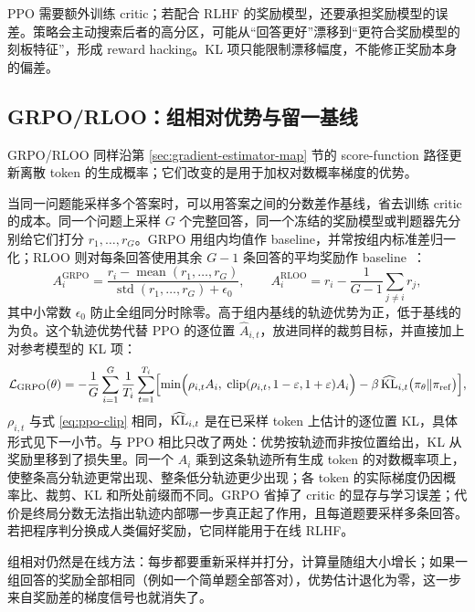 PPO 需要额外训练 critic；若配合 RLHF 的奖励模型，还要承担奖励模型的误差。策略会主动搜索后者的高分区，可能从“回答更好”漂移到“更符合奖励模型的刻板特征”，形成 reward hacking。KL 项只能限制漂移幅度，不能修正奖励本身的偏差。

\subsection{GRPO/RLOO：组相对优势与留一基线}

GRPO/RLOO 同样沿第 \ref{sec:gradient-estimator-map} 节的 score-function 路径更新离散 token 的生成概率；它们改变的是用于加权对数概率梯度的优势。

当同一问题能采样多个答案时，可以用答案之间的分数差作基线，省去训练 critic 的成本。同一个问题上采样 \(G\) 个完整回答，同一个冻结的奖励模型或判题器先分别给它们打分 \(r_1,\ldots,r_G\)。GRPO 用组内均值作 baseline，并常按组内标准差归一化；RLOO 则对每条回答使用其余 \(G-1\) 条回答的平均奖励作 baseline~\cite{shao2024grpo,ahmadian2024rloo}：
\begin{equation}
 A_i^{\mathrm{GRPO}}=\frac{r_i-\operatorname{mean}(r_1,\ldots,r_G)}{\operatorname{std}(r_1,\ldots,r_G)+\epsilon_0},\qquad
 A_i^{\mathrm{RLOO}}=r_i-\frac{1}{G-1}\sum_{j\neq i}r_j,
 \label{eq:grpo-advantage}
\end{equation}
其中小常数 \(\epsilon_0\) 防止全组同分时除零。高于组内基线的轨迹优势为正，低于基线的为负。这个轨迹优势代替 PPO 的逐位置 \(\widehat A_{i,t}\)，放进同样的裁剪目标，并直接加上对参考模型的 KL 项：
\begin{equation}
 \mathcal L_{\mathrm{GRPO}}(\theta)
 =-\frac1G\sum_{i=1}^{G}\frac1{T_i}\sum_{t=1}^{T_i}
 \Bigl[\min\Bigl(\rho_{i,t}A_i,\;\operatorname{clip}(\rho_{i,t},1-\varepsilon,1+\varepsilon)A_i\Bigr)
 -\beta\,\widehat{\mathrm{KL}}_{i,t}\bigl(\pi_\theta\Vert\pi_{\mathrm{ref}}\bigr)\Bigr],
 \label{eq:grpo-loss}
\end{equation}
\(\rho_{i,t}\) 与式 \eqref{eq:ppo-clip} 相同，\(\widehat{\mathrm{KL}}_{i,t}\) 是在已采样 token 上估计的逐位置 KL，具体形式见下一小节。与 PPO 相比只改了两处：优势按轨迹而非按位置给出，KL 从奖励里移到了损失里。同一个 \(A_i\) 乘到这条轨迹所有生成 token 的对数概率项上，使整条高分轨迹更常出现、整条低分轨迹更少出现；各 token 的实际梯度仍因概率比、裁剪、KL 和所处前缀而不同。GRPO 省掉了 critic 的显存与学习误差；代价是终局分数无法指出轨迹内部哪一步真正起了作用，且每道题要采样多条回答。若把程序判分换成人类偏好奖励，它同样能用于在线 RLHF。

组相对仍然是在线方法：每步都要重新采样并打分，计算量随组大小增长；如果一组回答的奖励全部相同（例如一个简单题全部答对），优势估计退化为零，这一步来自奖励差的梯度信号也就消失了。

